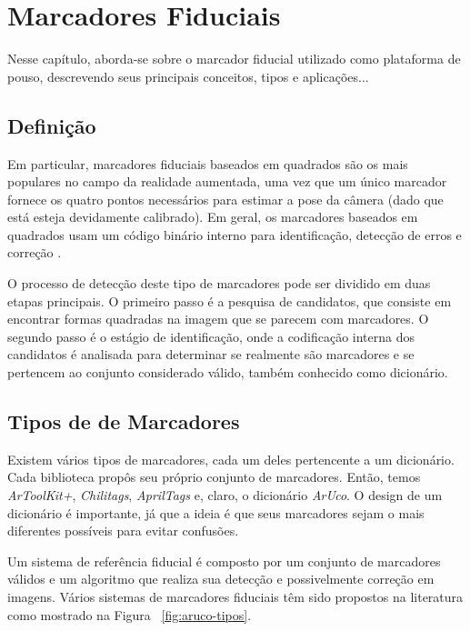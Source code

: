 \chapter{Marcadores Fiduciais}

    Nesse capítulo, aborda-se sobre o marcador fiducial utilizado como plataforma de pouso, descrevendo seus principais conceitos, tipos e aplicações...

\section{Definição}

Em particular, marcadores fiduciais baseados em quadrados são os mais populares no campo da realidade aumentada, uma vez que um único marcador fornece os quatro pontos necessários para estimar a pose da câmera (dado que está esteja devidamente calibrado). Em geral, os marcadores baseados em quadrados usam um código binário interno para identificação, detecção de erros e correção \cite{Ramirez2018}.

O processo de detecção deste tipo de marcadores pode ser dividido em duas etapas principais. O primeiro passo é a pesquisa de candidatos, que consiste em encontrar formas quadradas na imagem que se parecem com marcadores. O segundo passo é o estágio de identificação, onde a codificação interna dos candidatos é analisada para determinar se realmente são marcadores e se pertencem ao conjunto considerado válido, também conhecido como dicionário.

\section{Tipos de de Marcadores}

Existem vários tipos de marcadores, cada um deles pertencente a um dicionário. Cada biblioteca propôs seu próprio conjunto de marcadores. Então, temos \textit{ArToolKit+}, \textit{Chilitags}, \textit{AprilTags} e, claro, o dicionário \textit{ArUco}. O design de um dicionário é importante, já que a ideia é que seus marcadores sejam o mais diferentes possíveis para evitar confusões. 

Um sistema de referência fiducial é composto por um conjunto de marcadores válidos e um algoritmo que realiza sua detecção e possivelmente correção em imagens. Vários sistemas de marcadores fiduciais têm sido propostos na literatura como mostrado na Figura ~\ref{fig:aruco-tipos}.

